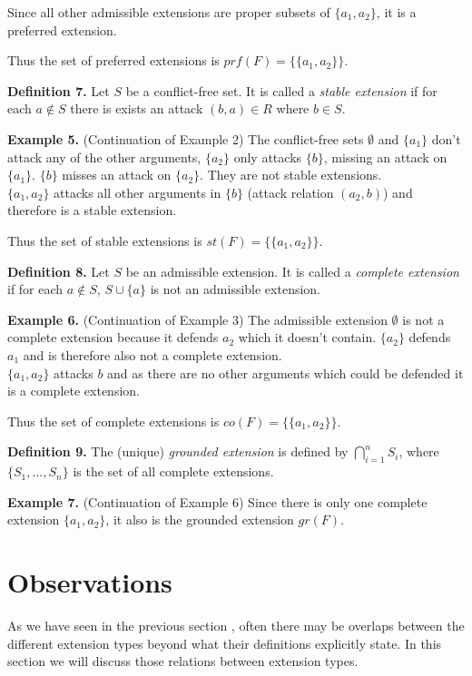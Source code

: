 \documentclass[draft,final]{vutinfth} %
\newcommand{\hl}{\par\medskip\noindent}
\newcommand{\dl}{\par\bigskip\noindent}
\begin{document}
Since all other admissible extensions are proper subsets of $\{a_1,a_2\}$, it is a preferred extension.\hl
Thus the set of preferred extensions is $prf(F)=\{\{a_1,a_2\}\}$.\dl
\textbf{Definition 7.} Let $S$ be a conflict-free set. It is called a \emph{stable extension} if for each $a\not\in S$ there is exists an attack $(b,a)\in R$ where $b\in S$.\dl
\textbf{Example 5.} (Continuation of Example 2) The conflict-free sets $\emptyset$ and $\{a_1\}$ don't attack any of the other arguments, $\{a_2\}$ only attacks $\{b\}$, missing an attack on $\{a_1\}$. $\{b\}$ misses an attack on $\{a_2\}$. They are not stable extensions.\\
$\{a_1,a_2\}$ attacks all other arguments in $\{b\}$ (attack relation $(a_2,b)$) and therefore is a stable extension.\hl
Thus the set of stable extensions is $st(F)=\{\{a_1,a_2\}\}$.\dl
\textbf{Definition 8.} Let $S$ be an admissible extension. It is called a \emph{complete extension} if for each $a\not\in S$, $S\cup \{a\}$ is not an admissible extension.\dl
\textbf{Example 6.} (Continuation of Example 3) The admissible extension $\emptyset$ is not a complete extension because it defends $a_2$ which it doesn't contain. $\{a_2\}$ defends $a_1$ and is therefore also not a complete extension.\\
$\{a_1,a_2\}$ attacks $b$ and as there are no other arguments which could be defended it is a complete extension.\hl
Thus the set of complete extensions is $co(F)=\{\{a_1,a_2\}\}$.\dl
\textbf{Definition 9.} The (unique) \emph{grounded extension} is defined by $\bigcap\limits_{i=1}^n{S_i}$, where $\{S_1,...,S_n\}$ is the set of all complete extensions.\dl
\textbf{Example 7.} (Continuation of Example 6) Since there is only one complete extension $\{a_1,a_2\}$, it also is the grounded extension $gr(F)$.\dl

\chapter{Observations}

As we have seen in the previous section%
, often there may be overlaps between the different extension types beyond what their definitions explicitly state. In this section we will discuss those relations between extension types.\dl
\end{document}
